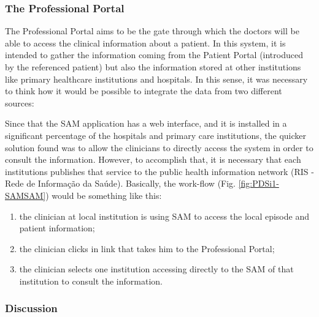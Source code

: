 \subsubsection{The Professional Portal}
The Professional Portal aims to be the gate through which the doctors will be able to access the clinical information about a patient. In this system, it is intended to gather the information coming from the Patient Portal (introduced by the referenced patient) but also the information stored at other institutions like primary healthcare institutions and hospitals. In this sense, it was necessary to think how it would be possible to integrate the data from two different sources:

Since that the SAM application has a web interface, and it is installed in a significant percentage of the hospitals and primary care institutions, the quicker solution found was to allow the clinicians to directly access the system in order to consult the information. However, to accomplish that, it is necessary that each institutions publishes that service to the public health information network (RIS - Rede de Informação da Saúde). Basically, the work-flow (Fig. \ref{fig:PDSi1-SAMSAM}) would be something like this:
\begin{enumerate}
\item the clinician at local institution is using SAM to access the local episode and patient information;
\item the clinician clicks in link that takes him to the Professional Portal;
\item the clinician selects one institution accessing directly to the SAM of that institution to consult the information.
\end{enumerate}


\subsubsection{Discussion}

